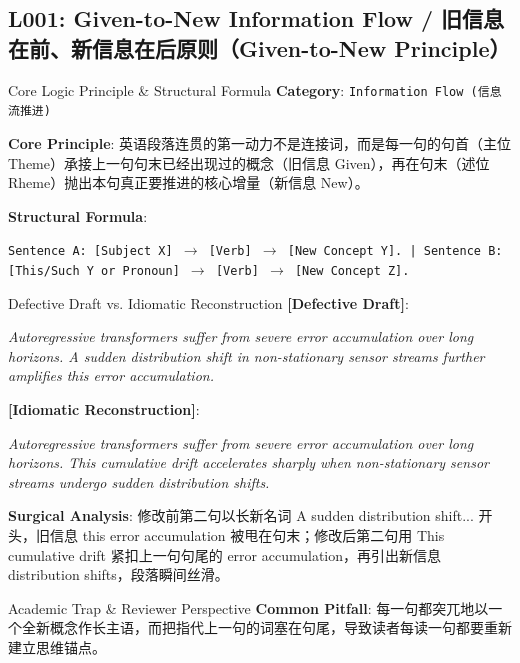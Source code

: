 \subsection{L001: Given-to-New Information Flow / 旧信息在前、新信息在后原则（Given-to-New Principle）}\label{sec:logic:L001}
\begin{ConceptBox}{Core Logic Principle \& Structural Formula}
\textbf{Category}: \texttt{Information Flow (信息流推进)}\par\vspace{3pt}
\textbf{Core Principle}: 英语段落连贯的第一动力不是连接词，而是每一句的句首（主位 Theme）承接上一句句末已经出现过的概念（旧信息 Given），再在句末（述位 Rheme）抛出本句真正要推进的核心增量（新信息 New）。\par\vspace{4pt}
\textbf{Structural Formula}:\par\noindent\texttt{Sentence A: [Subject X] $\to$ [Verb] $\to$ [New Concept Y]. | Sentence B: [This/Such Y or Pronoun] $\to$ [Verb] $\to$ [New Concept Z].}
\end{ConceptBox}
\begin{ExampleBox}{Defective Draft vs. Idiomatic Reconstruction}
\textbf{\color{TargetHighlight}[Defective Draft]}:\par\textit{Autoregressive transformers suffer from severe error accumulation over long horizons. A sudden distribution shift in non-stationary sensor streams further amplifies this error accumulation.}\par\vspace{4pt}
\textbf{\color{AcadNavy}[Idiomatic Reconstruction]}:\par\textit{Autoregressive transformers suffer from severe error accumulation over long horizons. This cumulative drift accelerates sharply when non-stationary sensor streams undergo sudden distribution shifts.}\par\vspace{4pt}
\textbf{Surgical Analysis}: 修改前第二句以长新名词 A sudden distribution shift... 开头，旧信息 this error accumulation 被甩在句末；修改后第二句用 This cumulative drift 紧扣上一句句尾的 error accumulation，再引出新信息 distribution shifts，段落瞬间丝滑。
\end{ExampleBox}
\begin{TipBox}{Academic Trap \& Reviewer Perspective}
\textbf{Common Pitfall}: 每一句都突兀地以一个全新概念作长主语，而把指代上一句的词塞在句尾，导致读者每读一句都要重新建立思维锚点。
\end{TipBox}
\vspace{6pt}
